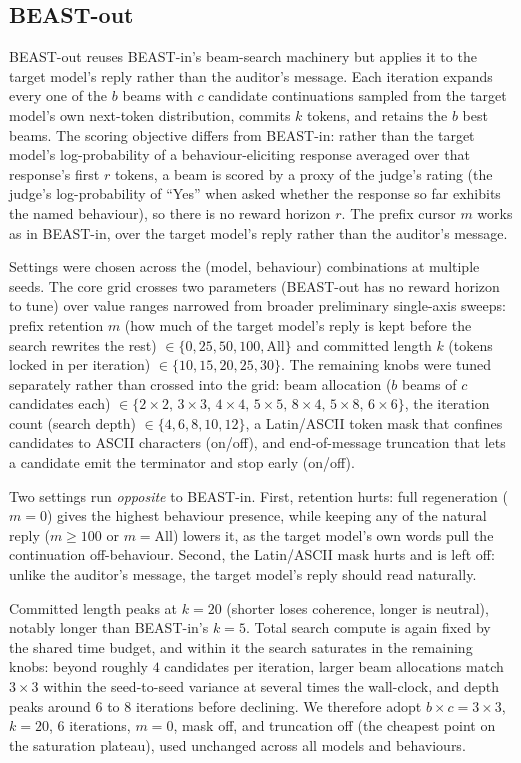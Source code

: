 \documentclass{article}
\begin{document}
\subsection{BEAST-out}
BEAST-out reuses BEAST-in's beam-search machinery but applies it to the target model's reply rather than the auditor's message. Each iteration expands every one of the $b$ beams with $c$ candidate continuations sampled from the target model's own next-token distribution, commits $k$ tokens, and retains the $b$ best beams. The scoring objective differs from BEAST-in: rather than the target model's log-probability of a behaviour-eliciting response averaged over that response's first $r$ tokens, a beam is scored by a proxy of the judge's rating (the judge's log-probability of ``Yes'' when asked whether the response so far exhibits the named behaviour), so there is no reward horizon $r$. The prefix cursor $m$ works as in BEAST-in, over the target model's reply rather than the auditor's message.

Settings were chosen across the (model, behaviour) combinations at multiple seeds. The core grid crosses two parameters (BEAST-out has no reward horizon to tune) over value ranges narrowed from broader preliminary single-axis sweeps: prefix retention $m$ (how much of the target model's reply is kept before the search rewrites the rest) $\in \{0, 25, 50, 100, \text{All}\}$ and committed length $k$ (tokens locked in per iteration) $\in \{10, 15, 20, 25, 30\}$. The remaining knobs were tuned separately rather than crossed into the grid: beam allocation ($b$ beams of $c$ candidates each) $\in \{2\times2,\,3\times3,\,4\times4,\,5\times5,\,8\times4,\,5\times8,\,6\times6\}$, the iteration count (search depth) $\in \{4, 6, 8, 10, 12\}$, a Latin/ASCII token mask that confines candidates to ASCII characters (on/off), and end-of-message truncation that lets a candidate emit the terminator and stop early (on/off).

Two settings run \emph{opposite} to BEAST-in. First, retention hurts: full regeneration ($m = 0$) gives the highest behaviour presence, while keeping any of the natural reply ($m \ge 100$ or $m = \text{All}$) lowers it, as the target model's own words pull the continuation off-behaviour. Second, the Latin/ASCII mask hurts and is left off: unlike the auditor's message, the target model's reply should read naturally.

Committed length peaks at $k = 20$ (shorter loses coherence, longer is neutral), notably longer than BEAST-in's $k = 5$. Total search compute is again fixed by the shared time budget, and within it the search saturates in the remaining knobs: beyond roughly $4$ candidates per iteration, larger beam allocations match $3 \times 3$ within the seed-to-seed variance at several times the wall-clock, and depth peaks around $6$ to $8$ iterations before declining. We therefore adopt $b \times c = 3 \times 3$, $k = 20$, $6$ iterations, $m = 0$, mask off, and truncation off (the cheapest point on the saturation plateau), used unchanged across all models and behaviours.
\end{document}
